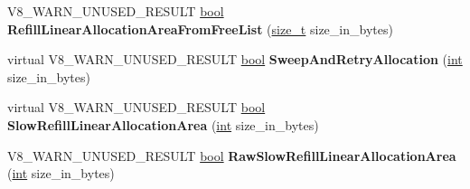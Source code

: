 \begin{DoxyCompactItemize}
V8\+\_\+\+W\+A\+R\+N\+\_\+\+U\+N\+U\+S\+E\+D\+\_\+\+R\+E\+S\+U\+LT \mbox{\hyperlink{classbool}{bool}} {\bfseries Refill\+Linear\+Allocation\+Area\+From\+Free\+List} (\mbox{\hyperlink{classsize__t}{size\+\_\+t}} size\+\_\+in\+\_\+bytes)
\item 
\mbox{\label{classv8_1_1internal_1_1PagedSpace_afaf66748c32af47763bde871b1088314}} 
virtual V8\+\_\+\+W\+A\+R\+N\+\_\+\+U\+N\+U\+S\+E\+D\+\_\+\+R\+E\+S\+U\+LT \mbox{\hyperlink{classbool}{bool}} {\bfseries Sweep\+And\+Retry\+Allocation} (\mbox{\hyperlink{classint}{int}} size\+\_\+in\+\_\+bytes)
\item 
\mbox{\label{classv8_1_1internal_1_1PagedSpace_a41e193daf710d2b30ad04c1f38267e38}} 
virtual V8\+\_\+\+W\+A\+R\+N\+\_\+\+U\+N\+U\+S\+E\+D\+\_\+\+R\+E\+S\+U\+LT \mbox{\hyperlink{classbool}{bool}} {\bfseries Slow\+Refill\+Linear\+Allocation\+Area} (\mbox{\hyperlink{classint}{int}} size\+\_\+in\+\_\+bytes)
\item 
\mbox{\label{classv8_1_1internal_1_1PagedSpace_aa839bd2910788baf3a5edadccf504a33}} 
V8\+\_\+\+W\+A\+R\+N\+\_\+\+U\+N\+U\+S\+E\+D\+\_\+\+R\+E\+S\+U\+LT \mbox{\hyperlink{classbool}{bool}} {\bfseries Raw\+Slow\+Refill\+Linear\+Allocation\+Area} (\mbox{\hyperlink{classint}{int}} size\+\_\+in\+\_\+bytes)
\end{DoxyCompactItemize}
